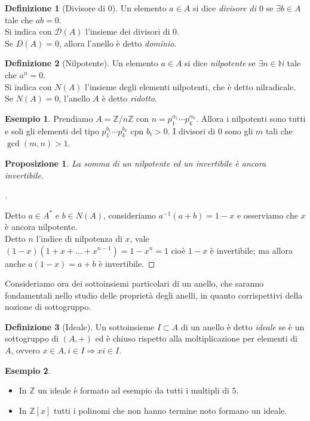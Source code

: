 \documentclass[a4paper,10pt]{article}
\theoremstyle{plain}
\newtheorem{prop}[thm]{Proposizione}
\theoremstyle{definition}
\newtheorem{defn}{Definizione}[section]
\newtheorem*{exmp}{Esempio}
\newenvironment{myproof}[1][\proofname]{%
  \begin{proof}[#1]$ $\par\nobreak\ignorespaces
}{%
  \qedhere
  \end{proof}
}
\newcommand{\N}{\mathbb{N}}
\newcommand{\Z}{\mathbb{Z}}
\newcommand{\D}{\mathcal{D}}
\newcommand{\Zn}[1]{\Z/#1\Z}
\begin{document}
\begin{defn}[Divisore di $0$]
    Un elemento $a\in A$ si dice \textit{divisore di $0$} se $\exists b\in A$ tale che $ab=0$.\\
    Si indica con $\D(A)$ l'insieme dei divisori di $0$.\\
    Se $D(A)=0$, allora l'anello è detto \textit{dominio}.
\end{defn}

\begin{defn}[Nilpotente]
    Un elemento $a\in A$ si dice \textit{nilpotente} se $\exists n\in\N$ tale che $a^n=0$.\\
    Si indica con $N(A)$ l'insieme degli elementi nilpotenti, che è detto nilradicale.\\
    Se $N(A)=0$, l'anello $A$ è detto \textit{ridotto}.
\end{defn}

\begin{exmp}
    Prendiamo $A=\Zn{n}$ con $n=p_1^{\alpha_1}\cdots p_k^{\alpha_k}$. Allora i nilpotenti sono tutti e soli gli elementi del tipo $p_1^{b_1}\cdots p_k^{b_k}$ cpn $b_i>0$. I divisori di 0 sono gli $m$ tali che $\gcd(m,n)>1$.
\end{exmp}

\begin{prop}
    La somma di un nilpotente ed un invertibile è ancora invertibile.
\end{prop}
\begin{myproof}
    Detto $a\in A^\ast$ e $b\in N(A)$, consideriamo $a^{-1}(a+b)=1-x$ e osserviamo che $x$ è ancora nilpotente.\\
    Detto $n$ l'indice di nilpotenza di $x$, vale $(1-x)(1+x+\dots+x^{n-1})=1-x^n=1$ cioè $1-x$ è invertibile; ma allora anche $a(1-x)=a+b$ è invertibile.
\end{myproof}

Consideriamo ora dei sottoinsiemi particolari di un anello, che saranno fondamentali nello studio delle proprietà degli anelli, in quanto corrispettivi della nozione di sottogruppo.\\

\begin{defn}[Ideale]
    Un sottoinsieme $I\subset A$ di un anello è detto \textit{ideale} se è un sottogruppo di $(A,+)$ ed è chiuso rispetto alla moltiplicazione per elementi di $A$, ovvero $x\in A,i\in I\Longrightarrow xi\in I$.
\end{defn}

\begin{exmp}
    $ $
    \begin{itemize}
        \item In $\Z$ un ideale è formato ad esempio da tutti i multipli di $5$.
        \item In $\Z[x]$ tutti i polinomi che non hanno termine noto formano un ideale.
    \end{itemize}
\end{exmp}
\end{document}
